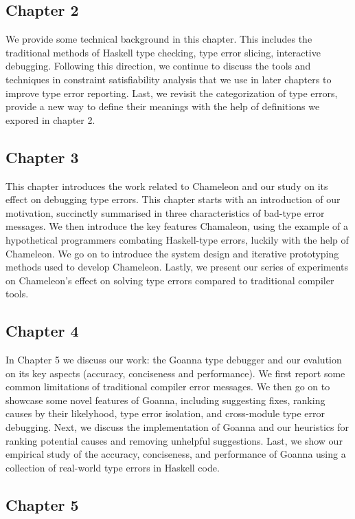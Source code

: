 \subsection{Chapter 2}
We provide some technical background in this chapter. This includes the traditional methods of Haskell type checking, type error slicing, interactive debugging. Following this direction, we continue to discuss the tools and techniques in constraint satisfiability analysis that we use in later chapters to improve type error reporting. Last, we revisit the categorization of type errors, provide a new way to define their meanings with the help of definitions we expored in chapter 2.


\subsection{Chapter 3}
This chapter introduces the work related to Chameleon and our study on its effect on debugging type errors. This chapter starts with an introduction of our motivation, succinctly summarised in three characteristics of bad-type error messages. We then introduce the key features Chamaleon, using the example of a  hypothetical programmers combating Haskell-type errors, luckily with the help of Chameleon. We go on to introduce the system design and iterative prototyping methods used to develop Chameleon. Lastly, we present our series of experiments on Chameleon's effect on solving type errors compared to traditional compiler tools. 


\subsection{Chapter 4}

In Chapter 5 we discuss our work: the Goanna type debugger and our evalution on its key aspects (accuracy, conciseness and performance). We first report some common limitations of traditional compiler error messages. We then go on to showcase some novel features of Goanna, including suggesting fixes, ranking causes by their likelyhood, type error isolation, and cross-module type error debugging.  Next, we discuss the implementation of Goanna and our heuristics for ranking potential causes and removing unhelpful suggestions. Last, we show our empirical study of the accuracy, conciseness, and performance of Goanna using a collection of real-world type errors in Haskell code. 

\subsection{Chapter 5}


